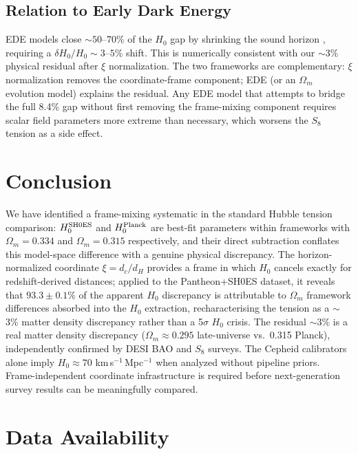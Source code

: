 \documentclass[usenatbib]{mnras}
\begin{document}
\subsection{Relation to Early Dark Energy}

EDE models close $\sim50$--$70$\% of the $H_0$ gap by shrinking the sound
horizon \citep{poulin2019}, requiring a $\delta H_0/H_0 \sim 3$--$5$\%
shift. This is numerically consistent with our $\sim$3\% physical residual
after $\xi$ normalization. The two frameworks are complementary: $\xi$
normalization removes the coordinate-frame component; EDE (or an
$\Omega_m$ evolution model) explains the residual. Any EDE model that
attempts to bridge the full 8.4\% gap without first removing the
frame-mixing component requires scalar field parameters more extreme than
necessary, which worsens the $S_8$ tension as a side effect.

\section{Conclusion}

We have identified a frame-mixing systematic in the standard Hubble tension
comparison: $H_0^{\rm SH0ES}$ and $H_0^{\rm Planck}$ are best-fit parameters
within frameworks with $\Omega_m = 0.334$ and $\Omega_m = 0.315$ respectively,
and their direct subtraction conflates this model-space difference with a
genuine physical discrepancy. The horizon-normalized coordinate
$\xi = d_c/d_H$ provides a frame in which $H_0$ cancels exactly for
redshift-derived distances; applied to the Pantheon+SH0ES dataset, it
reveals that $93.3 \pm 0.1$\% of the apparent $H_0$ discrepancy is
attributable to $\Omega_m$ framework differences absorbed into the $H_0$
extraction, recharacterising the tension as a $\sim$3\% matter density
discrepancy rather than a 5$\sigma$ $H_0$ crisis.
The residual $\sim$3\% is a real matter density discrepancy
($\Omega_m \approx 0.295$ late-universe vs.\ 0.315 Planck), independently
confirmed by DESI BAO and $S_8$ surveys. The Cepheid calibrators alone
imply $H_0 \approx 70$ km\,s$^{-1}$\,Mpc$^{-1}$ when analyzed without
pipeline priors. Frame-independent coordinate infrastructure is required
before next-generation survey results can be meaningfully compared.

\section*{Data Availability}
\end{document}

